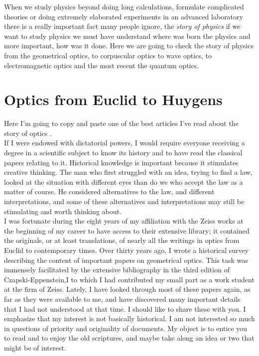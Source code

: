 When we study physics beyond doing long calculations, formulate complicated theories or doing extremely elaborated experiments in an advanced laboratory there is a really important fact many people ignore, the \textit{story of physics} if we want to study physics we must have understand where was born the physics and more important, how was it done. Here we are going to check the story of physics from the geometrical optics, to corpuscular optics to wave optics, to electromagnetic optics and the most recent the quantum optics.

    \section{Optics from Euclid to Huygens}
    
         Here I'm going to copy and paste one of the best articles I've read about the story of optics \citep{herzberger1966optics}.\\

         If I were endowed with dictatorial powers, I would require everyone receiving a degree in a scientific subject to know its history and to have read the classical papers relating to it.
         Historical knowledge is important because it stimulates creative thinking. The man who first struggled with an idea, trying to find a law, looked at the situation with different eyes than do we who accept the law as a matter of course. He considered alternatives to the law, and different interpretations, and some of these alternatives and interpretations may still be stimulating and worth thinking about.\\
         
         I was fortunate during the eight years of my affiliation with the Zeiss works at the beginning of my career to have access to their extensive library; it contained the originals, or at least translations, of nearly all the writings in optics from Euclid to contemporary times. Over thirty years ago, I wrote a historical survey describing the content of important papers on geometrical optics. This task was immensely facilitated by the extensive bibliography in the third edition of Czapski-Eppenstein,I to which I had contributed my small part as a work student at the firm of Zeiss. Lately, I have looked through most of these papers again, as far as they were available to me, and have discovered many important details that I had not understood at that time. I should like to share these with you. I emphasize that my interest is not basically historical. I am not interested so much in questions of priority and originality of documents. My object is to entice you to read and to enjoy the old scriptures, and maybe take along an idea or two that might be of interest.

